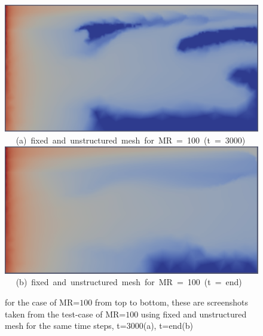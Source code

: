 \begin{figure}[ht] 
\vbox{
\hbox{\hspace{3.5cm}
\includegraphics[width=.5\textwidth]{./Pics1/mr100_fixed/mr100_fixed_3000.pdf} 
}
\vspace{0.0cm}
\hbox{\hspace{5.0cm} (a) fixed and unstructured mesh for MR = 100 (t = 3000)   
}
\hbox{\hspace{3.5cm}
\includegraphics[width=.5\textwidth]{./Pics1/mr100_fixed/mr100_fixed_end.pdf}
}
\vspace{0.0cm}
\hbox{\hspace{5.0cm} (b) fixed and unstructured mesh for MR = 100 (t = end)   
}
}     
\caption{for the case of MR=$100$ from top to bottom, these are screenshots taken from the test-case of MR=$100$ using fixed and unstructured mesh for the same time steps, t=3000(a), t=end(b) }
\label{fig:4testcase_b}
\end{figure}



